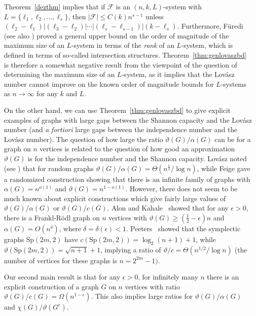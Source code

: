 \documentclass[11pt]{article}
\theoremstyle{definition}
\theoremstyle{remark}
\newcommand{\cF}{\mathcal{F}}
\begin{document}
Theorem~\ref{dezthm} implies that if $\cF$ is an $(n, k, L)$-system with $L = \{\ell_1, \ell_2, \ldots, \ell_s\}$, then $|\cF| \le C(k)n^{s-1}$ unless $(\ell_2 - \ell_1) | (\ell_3 - \ell_2) | \cdots | (\ell_s - \ell_{s-1}) | (k-\ell_s)$. Furthermore, F\"{u}redi~\cite{Furedi83} (see also \cite{Furedi91}) proved a general upper bound on the order of magnitude of the maximum size of an $L$-system in terms of the \emph{rank} of an $L$-system, which is defined in terms of so-called intersection structures. Theorem~\ref{thm:genlovaszbd} is therefore a somewhat negative result from the viewpoint of the question of determining the maximum size of an $L$-system, as it implies that the Lov\'asz number cannot improve on the known order of magnitude bounds for $L$-systems as $n\rightarrow\infty$ for any $k$ and $L$. 

On the other hand, we can use Theorem~\ref{thm:genlovaszbd} to give explicit examples of graphs with large gaps between the Shannon capacity and the Lov\'asz number (and \textit{a fortiori} large gaps between the independence number and the Lov\'asz number). The question of how large the ratio $\vartheta(G)/\alpha(G)$ can be for a graph on $n$ vertices is related to the question of how good an approximation $\vartheta(G)$ is for the independence number and the Shannon capacity. Lov\'asz noted (see \cite{K}) that for random graphs $\vartheta(G)/\alpha(G) = \Theta(n^{\frac12}/\log n)$, while Feige \cite{F} gave a randomized construction showing that there is an infinite family of graphs with $\alpha(G) = n^{o(1)}$ and $\vartheta(G) = n^{1-o(1)}$. However, there does not seem to be much known about explicit constructions which give fairly large values of $\vartheta(G)/\alpha(G)$ or $\vartheta(G)/c(G)$. Alon and Kahale~\cite{AK} showed that  for any $\epsilon > 0$, there is a  Frankl-R\"{o}dl graph on $n$ vertices with $\vartheta(G) \ge (\frac12 - \epsilon)n$ and $\alpha(G) = O(n^{\delta})$, where $\delta = \delta(\epsilon) < 1$. Peeters~\cite[Remark 2.1]{Peeters} showed that the symplectic graphs $\text{Sp}(2m, 2)$ have $c(\text{Sp}(2m, 2)) = \log_2(n+1) + 1$, while $\vartheta(\text{Sp}(2m, 2)) = \sqrt{n + 1} + 1$, implying a ratio of $\vartheta/c = \Theta(n^{1/2}/\log n)$ (the number of vertices for these graphs is $n=2^{2m} -1)$. 

Our second main result is that for any $\epsilon > 0$, for infinitely many $n$ there is an explicit construction of a graph $G$ on $n$ vertices with ratio $\vartheta(G)/c(G) = \Omega(n^{1-\epsilon})$. This also implies large ratios for $\vartheta(G)/\alpha(G)$ and $\chi(G)/\vartheta(G^c)$. 
\end{document}
